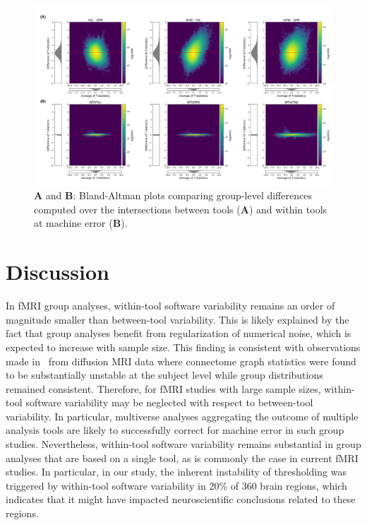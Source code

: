 \documentclass[11pt,onecolumn]{article}
\begin{document}
\begin{figure}[ht]
  \centering
    \includegraphics[width=.9\textwidth]{figures/plots/Bland-Altman/fixed-mask/unthresh-gl-frame.png}
  \caption{\textbf{A} and \textbf{B}: Bland-Altman plots comparing group-level differences computed over the intersections 
  between tools (\textbf{A}) and within tools at machine error (\textbf{B}).}%
  \label{fig:unthresh-maps-mask}
\end{figure}


\section{Discussion}

In fMRI group analyses, within-tool software variability remains an order
of magnitude smaller than between-tool variability. This is likely
explained by the fact that group analyses benefit from regularization of
numerical noise, which is expected to increase with sample size. This finding is
consistent with observations made in~\cite{kiar2020numerical} from
diffusion MRI data where connectome graph statistics were found to be
substantially unstable at the subject level while group distributions
remained consistent. Therefore,
for fMRI studies with large sample sizes, within-tool software variability
may be neglected with respect to between-tool variability. In particular,
multiverse analyses aggregating the outcome of multiple analysis tools are
likely to successfully correct for machine error in such group studies.  Nevertheless, within-tool software variability remains
substantial in group analyses that are based on a single tool, as is
commonly the case in current fMRI studies. In particular, in our study, the
inherent instability of thresholding was triggered by within-tool software
variability in 20\% of 360 brain regions, which indicates that it might have
impacted neuroscientific conclusions related to these regions.
\end{document}
